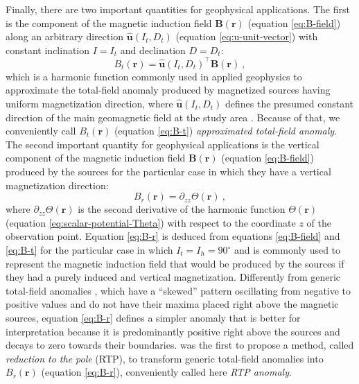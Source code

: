 Finally, there are two important quantities for geophysical applications.
The first is the component of the magnetic induction field $\mathbf{B}(\mathbf{r})$
(equation \ref{eq:B-field}) along an arbitrary direction 
$\hat{\mathbf{u}}(I_{t}, D_{t})$ (equation \ref{eq:u-unit-vector}) with constant 
inclination $I = I_{t}$ and declination $D = D_{t}$:
\begin{equation}
B_{t}(\mathbf{r}) 
= \hat{\mathbf{u}}(I_{t}, D_{t})^{\top} \mathbf{B}(\mathbf{r}) \: ,
\label{eq:B-t}
\end{equation}
which is a harmonic function commonly used in applied geophysics to approximate the
total-field anomaly produced by magnetized sources having uniform magnetization direction,
where $\hat{\mathbf{u}}(I_{t}, D_{t})$ defines the presumed constant direction of the main
geomagnetic field at the study area \cite[][ p. 179]{blakely1996}. Because of that,
we conveniently call $B_{t}(\mathbf{r})$ (equation \ref{eq:B-t}) 
\textit{approximated total-field anomaly}.
The second important quantity for geophysical applications is the vertical component 
of the magnetic induction field $\mathbf{B}(\mathbf{r})$ (equation \ref{eq:B-field})
produced by the sources for the particular case in which they have a vertical 
magnetization direction:
\begin{equation}
B_{r}(\mathbf{r}) = \partial_{zz} \Theta(\mathbf{r}) \: ,
\label{eq:B-r}
\end{equation}
where $\partial_{zz} \Theta(\mathbf{r})$ is the second derivative of the
harmonic function $\Theta(\mathbf{r})$ (equation \ref{eq:scalar-potential-Theta}) with
respect to the coordinate $z$ of the observation point.
Equation \ref{eq:B-r} is deduced from equations \ref{eq:B-field} and 
\ref{eq:B-t} for the particular case in which $I_{t} = I_{h} = 90^{\circ}$ and
is commonly used to represent the magnetic induction field 
that would be produced by the sources if they had a purely induced and vertical
magnetization. 
Differently from generic total-field anomalies 
\cite[e.g.,][ p. 178]{blakely1996}, which have a ``skewed'' pattern 
oscillating from negative to positive values and do not have their maxima placed right 
above the magnetic sources, equation \ref{eq:B-r} defines a simpler anomaly that is
better for interpretation because it is predominantly positive right above the sources and
decays to zero towards their boundaries. \citet{baranov1957} was the first
to propose a method, called \textit{reduction to the pole} (RTP), to transform generic
total-field anomalies into $B_{r}(\mathbf{r})$ (equation \ref{eq:B-r}),
conveniently called here \textit{RTP anomaly}.



